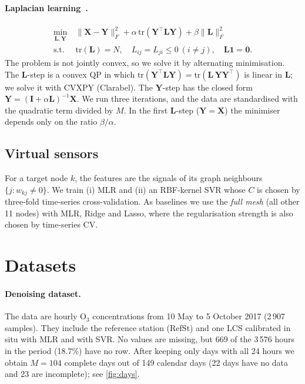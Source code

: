 \documentclass[11pt,a4paper]{article}
\newcommand{\Othree}{O$_3$}
\begin{document}
\paragraph{Laplacian learning~\cite{dong2015}.}
\begin{equation}
\begin{aligned}
  \min_{\mathbf L,\mathbf Y}\ & \|\mathbf X-\mathbf Y\|_F^2+\alpha\,\mathrm{tr}(\mathbf Y^\top\mathbf L\mathbf Y)+\beta\|\mathbf L\|_F^2\\
  \text{s.t. }& \mathrm{tr}(\mathbf L)=N,\quad L_{ij}=L_{ji}\le0\ (i\ne j),\quad \mathbf L\mathbf 1=\mathbf 0.
\end{aligned}
\end{equation}
The problem is not jointly convex, so we solve it by alternating minimisation. The $\mathbf L$-step is a convex QP in which $\mathrm{tr}(\mathbf Y^\top\mathbf L\mathbf Y)=\mathrm{tr}(\mathbf L\,\mathbf Y\mathbf Y^\top)$ is linear in $\mathbf L$; we solve it with CVXPY (Clarabel). The $\mathbf Y$-step has the closed form $\mathbf Y=(\mathbf I+\alpha\mathbf L)^{-1}\mathbf X$. We run three iterations, and the data are standardised with the quadratic term divided by $M$. In the first $\mathbf L$-step ($\mathbf Y=\mathbf X$) the minimiser depends only on the ratio $\beta/\alpha$.

\subsection{Virtual sensors}
For a target node $k$, the features are the signals of its graph neighbours $\{j:w_{kj}\ne0\}$. We train (i) MLR and (ii) an RBF-kernel SVR whose $C$ is chosen by three-fold time-series cross-validation. As baselines we use the \emph{full mesh} (all other 11 nodes) with MLR, Ridge and Lasso, where the regularisation strength is also chosen by time-series CV.

\section{Datasets}\label{sec:data}
\paragraph{Denoising dataset.} The data are hourly \Othree{} concentrations from 10 May to 5 October 2017 (2\,907 samples). They include the reference station (RefSt) and one LCS calibrated in situ with MLR and with SVR. No values are missing, but 669 of the 3\,576 hours in the period (18.7\%) have no row. After keeping only days with all 24 hours we obtain $M=104$ complete days out of 149 calendar days (22 days have no data and 23 are incomplete); see \cref{fig:days}.
\end{document}
